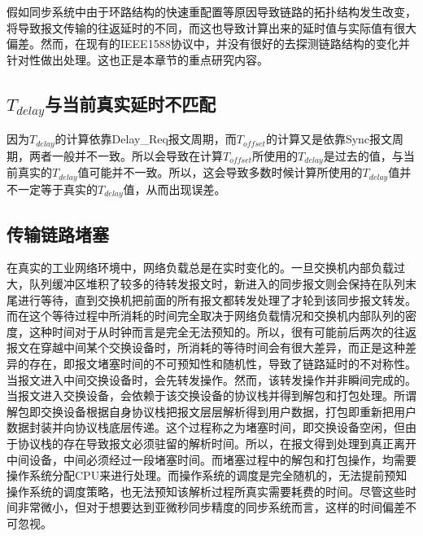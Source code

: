 假如同步系统中由于环路结构的快速重配置等原因导致链路的拓扑结构发生改变，将导致报文传输的往返延时的不同，而这也导致计算出来的延时值与实际值有很大偏差。然而，在现有的IEEE1588协议中，并没有很好的去探测链路结构的变化并针对性做出处理。这也正是本章节的重点研究内容。

\subsection{$T_{delay}$与当前真实延时不匹配}
因为$T_{delay}$的计算依靠Delay\_Req报文周期，而$T_{offset}$的计算又是依靠Sync报文周期，两者一般并不一致。所以会导致在计算$T_{offset}$所使用的$T_{delay}$是过去的值，与当前真实的$T_{delay}$值可能并不一致。所以，这会导致多数时候计算所使用的$T_{delay}$值并不一定等于真实的$T_{delay}$值，从而出现误差。


\subsection{传输链路堵塞}
在真实的工业网络环境中，网络负载总是在实时变化的。一旦交换机内部负载过大，队列缓冲区堆积了较多的待转发报文时，新进入的同步报文则会保持在队列末尾进行等待，直到交换机把前面的所有报文都转发处理了才轮到该同步报文转发。而在这个等待过程中所消耗的时间完全取决于网络负载情况和交换机内部队列的密度，这种时间对于从时钟而言是完全无法预知的。所以，很有可能前后两次的往返报文在穿越中间某个交换设备时，所消耗的等待时间会有很大差异，而正是这种差异的存在，即报文堵塞时间的不可预知性和随机性，导致了链路延时的不对称性。当报文进入中间交换设备时，会先转发操作。然而，该转发操作并非瞬间完成的。当报文进入交换设备，会依赖于该交换设备的协议栈并得到解包和打包处理。所谓解包即交换设备根据自身协议栈把报文层层解析得到用户数据，打包即重新把用户数据封装并向协议栈底层传递。这个过程称之为堵塞时间，即交换设备空闲，但由于协议栈的存在导致报文必须驻留的解析时间。所以，在报文得到处理到真正离开中间设备，中间必须经过一段堵塞时间。而堵塞过程中的解包和打包操作，均需要操作系统分配CPU来进行处理。而操作系统的调度是完全随机的，无法提前预知操作系统的调度策略，也无法预知该解析过程所真实需要耗费的时间。尽管这些时间非常微小，但对于想要达到亚微秒同步精度的同步系统而言，这样的时间偏差不可忽视。

